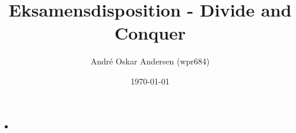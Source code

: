 \documentclass{article}
\title{Eksamensdisposition - Divide and Conquer}
\author{André Oskar Andersen (wpr684)}
\date{\today}
\begin{document}
\maketitle

\begin{itemize}
    \item 
\end{itemize}

\newpage

\section*{}
\end{document}
